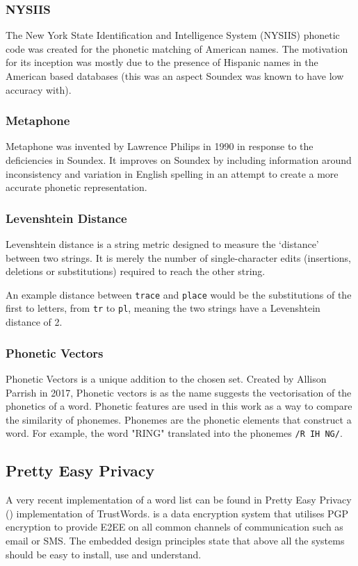 \subsubsection*{NYSIIS}
\label{sec:nysiis}
The New York State Identification and Intelligence System (NYSIIS) phonetic code was created for the phonetic matching of American names. The motivation for its inception was mostly due to the presence of Hispanic names in the American based databases (this was an aspect Soundex was known to have low accuracy with).

\subsubsection*{Metaphone}
\label{sec:metaphone}
Metaphone was invented by Lawrence Philips in 1990\cite{philips1990hanging} in response to the deficiencies in Soundex. It improves on Soundex by including information around inconsistency and variation in English spelling in an attempt to create a more accurate phonetic representation.

\subsubsection*{Levenshtein Distance}
\label{sec:leven}
Levenshtein distance is a string metric designed to measure the `distance' between two strings. It is merely the number of single-character edits (insertions, deletions or substitutions) required to reach the other string.

An example distance between \verb|trace| and \verb|place| would be the substitutions of the first to letters, from \verb|tr| to \verb|pl|, meaning the two strings have a Levenshtein distance of 2.

\subsubsection*{Phonetic Vectors}
\label{sec:phonetic_vectors}
Phonetic Vectors is a unique addition to the chosen set. Created by Allison Parrish in 2017\cite{parrish2017poetic}, Phonetic vectors is as the name suggests the vectorisation of the phonetics of a word. Phonetic features are used in this work as a way to compare the similarity of phonemes. Phonemes are the phonetic elements that construct a word. For example, the word "RING" translated into the phonemes \verb|/R IH NG/|. 

\clearpage

\subsection{Pretty Easy Privacy}
\label{sec:pep}
A very recent implementation of a word list can be found in Pretty Easy Privacy (\pep) implementation of TrustWords\cite{trustwords}. \pep is a data encryption system that utilises PGP encryption to provide E2EE on all common channels of communication such as email or SMS. The embedded design principles state that above all the systems should be easy to install, use and understand.

